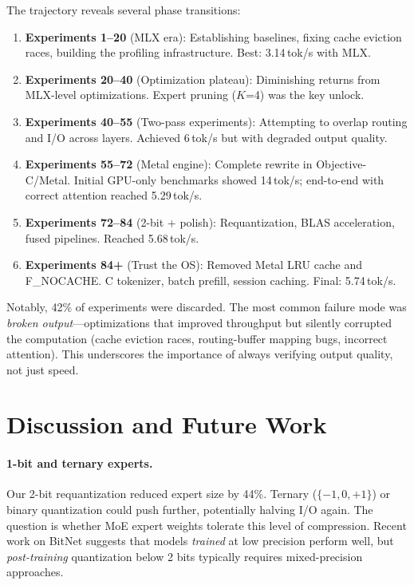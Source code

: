 \documentclass[11pt,twocolumn]{article}
\begin{document}
The trajectory reveals several phase transitions:
\begin{enumerate}[leftmargin=*,itemsep=2pt]
    \item \textbf{Experiments 1--20} (MLX era): Establishing baselines, fixing cache eviction races, building the profiling infrastructure. Best: 3.14\,tok/s with MLX.
    \item \textbf{Experiments 20--40} (Optimization plateau): Diminishing returns from MLX-level optimizations. Expert pruning ($K$=4) was the key unlock.
    \item \textbf{Experiments 40--55} (Two-pass experiments): Attempting to overlap routing and I/O across layers. Achieved 6\,tok/s but with degraded output quality.
    \item \textbf{Experiments 55--72} (Metal engine): Complete rewrite in Objective-C/Metal. Initial GPU-only benchmarks showed 14\,tok/s; end-to-end with correct attention reached 5.29\,tok/s.
    \item \textbf{Experiments 72--84} (2-bit + polish): Requantization, BLAS acceleration, fused pipelines. Reached 5.68\,tok/s.
    \item \textbf{Experiments 84+} (Trust the OS): Removed Metal LRU cache and F\_NOCACHE. C tokenizer, batch prefill, session caching. Final: 5.74\,tok/s.
\end{enumerate}

Notably, 42\% of experiments were discarded.
The most common failure mode was \emph{broken output}---optimizations that improved throughput but silently corrupted the computation (cache eviction races, routing-buffer mapping bugs, incorrect attention).
This underscores the importance of always verifying output quality, not just speed.

\section{Discussion and Future Work}

\paragraph{1-bit and ternary experts.}
Our 2-bit requantization reduced expert size by 44\%.
Ternary ($\{-1, 0, +1\}$) or binary quantization could push further, potentially halving I/O again.
The question is whether MoE expert weights tolerate this level of compression.
Recent work on BitNet suggests that models \emph{trained} at low precision perform well, but \emph{post-training} quantization below 2 bits typically requires mixed-precision approaches.
\end{document}
